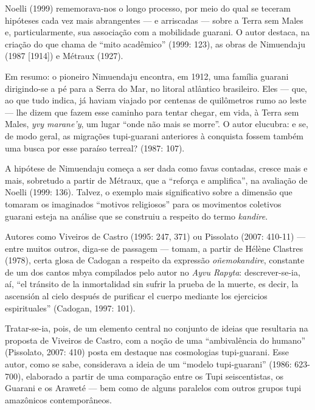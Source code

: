 Noelli (1999) rememorava-nos o longo processo, por meio do qual se
teceram hipóteses cada vez mais abrangentes --- e arriscadas --- sobre a
Terra sem Males e, particularmente, sua associação com a mobilidade
guarani. O autor destaca, na criação do que chama de ``mito acadêmico''
(1999: 123), as obras de Nimuendaju (1987 [1914]) e Métraux (1927).

Em resumo: o pioneiro Nimuendaju encontra, em 1912, uma família guarani
dirigindo-se a pé para a Serra do Mar, no litoral atlântico brasileiro.
Eles --- que, ao que tudo indica, já haviam viajado por centenas de
quilômetros rumo ao leste --- lhe dizem que fazem esse caminho para
tentar chegar, em vida, à Terra sem Males, \emph{yvy marane’y}, um lugar ``onde
não mais se morre''. O autor elucubra: e se, de modo geral, as migrações
tupi-guarani anteriores à conquista fossem também uma busca por esse
paraíso terreal? (1987: 107).

A hipótese de Nimuendaju começa a ser dada como favas contadas, cresce
mais e mais, sobretudo a partir de Métraux, que a ``reforça e
amplifica'', na avaliação de Noelli  (1999: 136). Talvez, o exemplo mais
significativo sobre a dimensão que tomaram os imaginados ``motivos
religiosos'' para os movimentos coletivos guarani esteja na análise que
se construiu a respeito do termo \emph{kandire}.

Autores como Viveiros de Castro (1995: 247, 371) ou Pissolato (2007:
410-11) --- entre muitos outros, diga-se de passagem --- tomam, a partir de
Hélène Clastres (1978), certa glosa de Cadogan a respeito da expressão
\emph{oñemokandire}, constante de um dos cantos mbya compilados pelo autor no
\emph{Ayvu Rapyta}: descrever-se-ia, aí, ``el tránsito de la inmortalidad sin
sufrir la prueba de la muerte, es decir, la ascensión al cielo después
de purificar el cuerpo mediante los ejercicios espirituales'' (Cadogan,
1997: 101). 

Tratar-se-ia, pois, de um elemento central no conjunto de ideias que
resultaria na proposta de Viveiros de Castro, com a noção de uma
``ambivalência do humano'' (Pissolato, 2007: 410) posta em destaque nas
cosmologias tupi-guarani. Esse autor, como se sabe, considerava a ideia
de um ``modelo tupi-guarani'' (1986: 623-700), elaborado a partir de uma
comparação entre os Tupi seiscentistas, os Guarani e os Araweté --- bem
como de alguns paralelos com outros grupos tupi amazônicos
contemporâneos.

